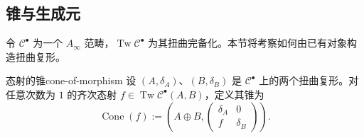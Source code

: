 \subsection{锥与生成元}\label{subsec:cones-generators}
令 $\mathcal C^\bullet$ 为一个 $A_\infty$ 范畴，$\operatorname{Tw}\mathcal C^\bullet$ 为其扭曲完备化。本节将考察如何由已有对象构造扭曲复形。

\begin{definition}{态射的锥}{cone-of-morphism}
设 $(A,\delta_A)$、$(B,\delta_B)$ 是 $\mathcal C^\bullet$ 上的两个扭曲复形。对任意次数为 $1$ 的齐次态射 $f\in\operatorname{Tw}\mathcal C^\bullet(A,B)$，定义其锥为
\[
  \operatorname{Cone}(f):=
  \left(A\oplus B,
  \begin{pmatrix}
    \delta_A&0\\
    f&\delta_B
  \end{pmatrix}\right).
\]
\end{definition}

